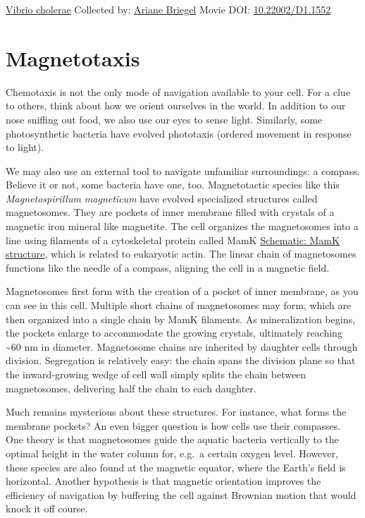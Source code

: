 \documentclass[]{tufte-book}
\begin{document}
\hypertarget{htmlwidget-5ede27206333035cf39f}{}

\label{fig:7-5a}\protect\hyperlink{tree}{Vibrio cholerae} Collected by: \protect\hyperlink{ariane_briegel}{Ariane Briegel} Movie DOI: \href{https://doi.org/10.22002/D1.1552}{10.22002/D1.1552}

\hypertarget{magnetotaxis}{%
\section{Magnetotaxis}\label{magnetotaxis}}

Chemotaxis is not the only mode of navigation available to your cell. For a clue to others, think about how we orient ourselves in the world. In addition to our nose sniffing out food, we also use our eyes to sense light. Similarly, some photosynthetic bacteria have evolved phototaxis (ordered movement in response to light).

We may also use an external tool to navigate unfamiliar surroundings: a compass. Believe it or not, some bacteria have one, too. Magnetotactic species like this \emph{Magnetospirillum magneticum} have evolved specialized structures called magnetosomes. They are pockets of inner membrane filled with crystals of a magnetic iron mineral like magnetite. The cell organizes the magnetosomes into a line using filaments of a cytoskeletal protein called MamK \protect\hyperlink{MamK_structure}{Schematic: MamK structure}, which is related to eukaryotic actin. The linear chain of magnetosomes functions like the needle of a compass, aligning the cell in a magnetic field.

Magnetosomes first form with the creation of a pocket of inner membrane, as you can see in this cell. Multiple short chains of magnetosomes may form, which are then organized into a single chain by MamK filaments. As mineralization begins, the pockets enlarge to accommodate the growing crystals, ultimately reaching \textasciitilde{}60 nm in diameter. Magnetosome chains are inherited by daughter cells through division. Segregation is relatively easy: the chain spans the division plane so that the inward-growing wedge of cell wall simply splits the chain between magnetosomes, delivering half the chain to each daughter.

Much remains mysterious about these structures. For instance, what forms the membrane pockets? An even bigger question is how cells use their compasses. One theory is that magnetosomes guide the aquatic bacteria vertically to the optimal height in the water column for, e.g.~a certain oxygen level. However, these species are also found at the magnetic equator, where the Earth's field is horizontal. Another hypothesis is that magnetic orientation improves the efficiency of navigation by buffering the cell against Brownian motion that would knock it off course.
\end{document}
